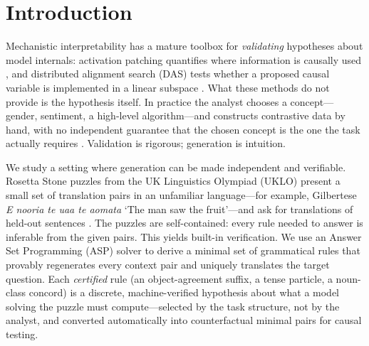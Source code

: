 \section{Introduction}
\label{sec:intro}

Mechanistic interpretability has a mature toolbox for \emph{validating}
hypotheses about model internals: activation patching quantifies where
information is causally used \citep{vig2020,meng2022,zhang2024}, and
distributed alignment search (DAS) tests whether a proposed causal variable
is implemented in a linear subspace \citep{geiger2024das,wu2023boundless}.
What these methods do not provide is the hypothesis itself. In practice the
analyst chooses a concept---gender, sentiment, a high-level algorithm---and
constructs contrastive data by hand, with no independent guarantee that the
chosen concept is the one the task actually requires
\citep{hase2023,lanham2023}. Validation is rigorous; generation is
intuition.

We study a setting where generation can be made independent and verifiable.
Rosetta Stone puzzles from the UK Linguistics Olympiad (UKLO) present a
small set of translation pairs in an unfamiliar language---for example,
Gilbertese \emph{E nooria te uaa te aomata} `The man saw the fruit'---and
ask for translations of held-out sentences \citep{bozhanov2013,lingoly}.
The puzzles are self-contained: every rule needed to answer is inferable
from the given pairs. This yields built-in verification. We use an Answer
Set Programming (ASP) solver \citep{gelfond1988,gebser2014} to derive a
minimal set of grammatical rules that provably regenerates every context
pair and uniquely translates the target question. Each \emph{certified}
rule (an object-agreement suffix, a tense particle, a noun-class concord)
is a discrete, machine-verified hypothesis about what a model solving the
puzzle must compute---selected by the task structure, not by the analyst,
and converted automatically into counterfactual minimal pairs for causal
testing.

